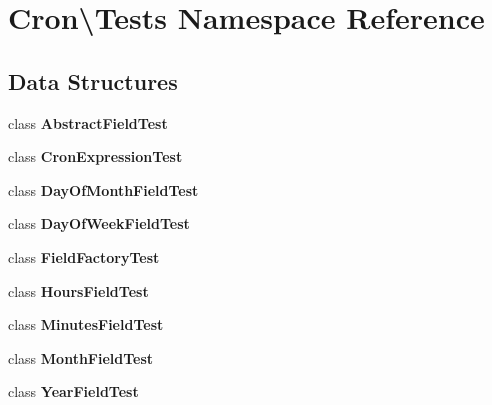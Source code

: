 \section{Cron\textbackslash{}Tests Namespace Reference}
\label{namespace_cron_1_1_tests}
\subsection*{Data Structures}
\begin{DoxyCompactItemize}
\item 
class {\bf Abstract\+Field\+Test}
\item 
class {\bf Cron\+Expression\+Test}
\item 
class {\bf Day\+Of\+Month\+Field\+Test}
\item 
class {\bf Day\+Of\+Week\+Field\+Test}
\item 
class {\bf Field\+Factory\+Test}
\item 
class {\bf Hours\+Field\+Test}
\item 
class {\bf Minutes\+Field\+Test}
\item 
class {\bf Month\+Field\+Test}
\item 
class {\bf Year\+Field\+Test}
\end{DoxyCompactItemize}
